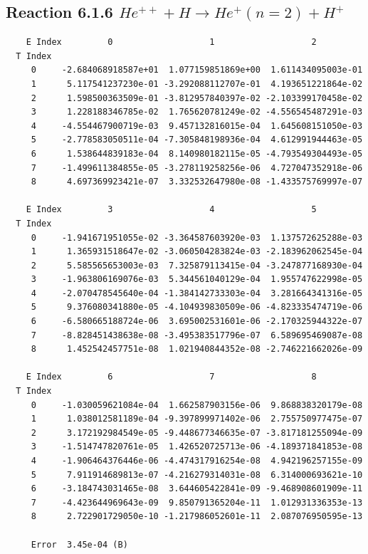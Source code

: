 \documentclass[12pt,dvipdfmx]{article}
\begin{document}
\newpage
\subsection{
Reaction 6.1.6 $   He^{++} + H \rightarrow He^+(n=2) + H^+$}


\begin{small}\begin{verbatim}
    E Index         0                   1                   2
  T Index
     0     -2.684068918587e+01  1.077159851869e+00  1.611434095003e-01
     1      5.117541237230e-01 -3.292088112707e-01  4.193651221864e-02
     2      1.598500363509e-01 -3.812957840397e-02 -2.103399170458e-02
     3      1.228188346785e-02  1.765620781249e-02 -4.556545487291e-03
     4     -4.554467900719e-03  9.457132816015e-04  1.645608151050e-03
     5     -2.778583050511e-04 -7.305848198936e-04  4.612991944463e-05
     6      1.538644839183e-04  8.140980182115e-05 -4.793549304493e-05
     7     -1.499611384855e-05 -3.278119258256e-06  4.727047352918e-06
     8      4.697369923421e-07  3.332532647980e-08 -1.433575769997e-07

    E Index         3                   4                   5
  T Index
     0     -1.941671951055e-02 -3.364587603920e-03  1.137572625288e-03
     1      1.365931518647e-02 -3.060504283824e-03 -2.183962062545e-04
     2      5.585565653003e-03  7.325879113415e-04 -3.247877168930e-04
     3     -1.963806169076e-03  5.344561040129e-04  1.955747622998e-05
     4     -2.070478545640e-04 -1.384142733303e-04  3.281664341316e-05
     5      9.376080341880e-05 -4.104939830509e-06 -4.823335474719e-06
     6     -6.580665188724e-06  3.695002531601e-06 -2.170325944322e-07
     7     -8.828451438638e-08 -3.495383517796e-07  6.589695469087e-08
     8      1.452542457751e-08  1.021940844352e-08 -2.746221662026e-09

    E Index         6                   7                   8
  T Index
     0     -1.030059621084e-04  1.662587903156e-06  9.868838320179e-08
     1      1.038012581189e-04 -9.397899971402e-06  2.755750977475e-07
     2      3.172192984549e-05 -9.448677346635e-07 -3.817181255094e-09
     3     -1.514747820761e-05  1.426520725713e-06 -4.189371841853e-08
     4     -1.906464376446e-06 -4.474317916254e-08  4.942196257155e-09
     5      7.911914689813e-07 -4.216279314031e-08  6.314000693621e-10
     6     -3.184743031465e-08  3.644605422841e-09 -9.468908601909e-11
     7     -4.423644969643e-09  9.850791365204e-11  1.012931336353e-13
     8      2.722901729050e-10 -1.217986052601e-11  2.087076950595e-13

     Error  3.45e-04 (B)
\end{verbatim}\end{small}
\end{document}
